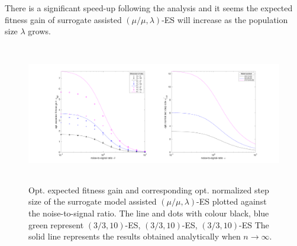 There is a significant speed-up following the analysis and it seems the expected fitness gain of surrogate assisted $(\mu/\mu,\lambda)$-ES will increase as the population size $\lambda$ grows.




\begin{center}
\begin{figure}
\includegraphics[height=2.4in, width=6in]{opt_stepSize_fitGain_v2}
\caption{Opt. expected fitness gain and corresponding opt. normalized step size of the surrogate model assisted $(\mu/\mu,\lambda)$-ES plotted against the noise-to-signal ratio. The line and dots with colour black, blue green represent $(3/3,10)$-ES, $(3/3,10)$-ES, $(3/3,10)$-ES The solid line represents the results obtained analytically when $n\rightarrow \infty$. }
\label{fig:opt_stepSize_fitGain}
\end{figure}
\end{center}





